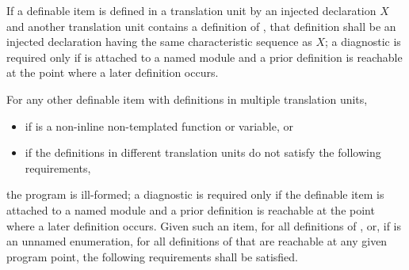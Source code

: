 \pnum
If a definable item  is defined in a translation unit
by an injected declaration $X$ and
another translation unit contains a definition of ,
that definition shall be an injected declaration
having the same characteristic sequence as $X$;
a diagnostic is required only if  is attached to a named module and
a prior definition is reachable
at the point where a later definition occurs.

\pnum
For any other definable item  with definitions in multiple translation units,
\begin{itemize}
\item
if  is a non-inline non-templated function or variable, or
\item
if the definitions in different translation units
do not satisfy the following requirements,
\end{itemize}
the program is ill-formed;
a diagnostic is required only
if the definable item is attached to a named module and
a prior definition is reachable
at the point where a later definition occurs.
Given such an item,
for all definitions of , or,
if  is an unnamed enumeration,
for all definitions of  that are reachable at any given program point,
the following requirements shall be satisfied.
